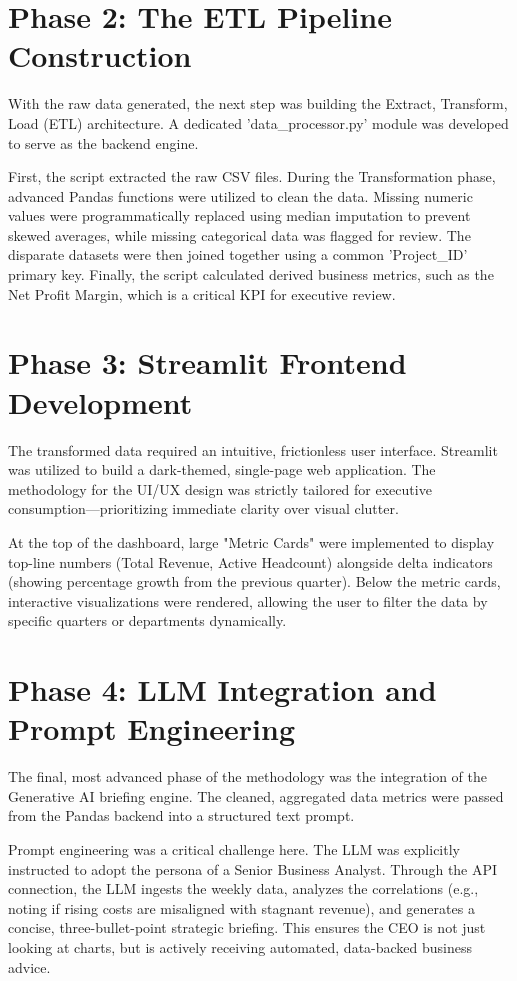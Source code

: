 \documentclass{book}
\begin{document}
\section{Phase 2: The ETL Pipeline Construction}


With the raw data generated, the next step was building the Extract, Transform, Load (ETL) architecture. A dedicated 'data\_processor.py' module was developed to serve as the backend engine. 

\par\noindent
First, the script extracted the raw CSV files. During the Transformation phase, advanced Pandas functions were utilized to clean the data. Missing numeric values were programmatically replaced using median imputation to prevent skewed averages, while missing categorical data was flagged for review. The disparate datasets were then joined together using a common 'Project\_ID' primary key. Finally, the script calculated derived business metrics, such as the Net Profit Margin, which is a critical KPI for executive review.



\section{Phase 3: Streamlit Frontend Development}
The transformed data required an intuitive, frictionless user interface. Streamlit was utilized to build a dark-themed, single-page web application. The methodology for the UI/UX design was strictly tailored for executive consumption—prioritizing immediate clarity over visual clutter.
\par\noindent
At the top of the dashboard, large "Metric Cards" were implemented to display top-line numbers (Total Revenue, Active Headcount) alongside delta indicators (showing percentage growth from the previous quarter). Below the metric cards, interactive visualizations were rendered, allowing the user to filter the data by specific quarters or departments dynamically.

\section{Phase 4: LLM Integration and Prompt Engineering}
The final, most advanced phase of the methodology was the integration of the Generative AI briefing engine. The cleaned, aggregated data metrics were passed from the Pandas backend into a structured text prompt.
\par\noindent
Prompt engineering was a critical challenge here. The LLM was explicitly instructed to adopt the persona of a Senior Business Analyst. Through the API connection, the LLM ingests the weekly data, analyzes the correlations (e.g., noting if rising costs are misaligned with stagnant revenue), and generates a concise, three-bullet-point strategic briefing. This ensures the CEO is not just looking at charts, but is actively receiving automated, data-backed business advice.
\end{document}
